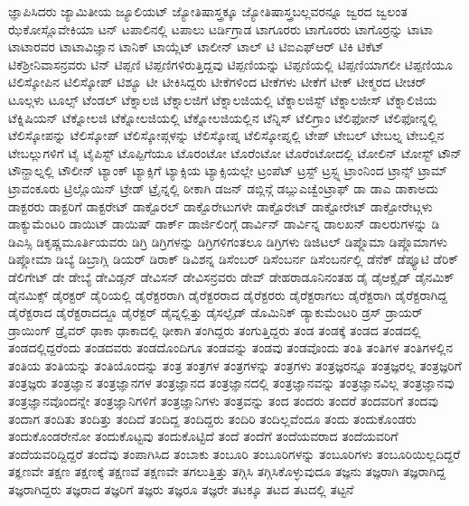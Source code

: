 {ಜ್ಞಾಪಿಸಿದರು
ಜ್ಯಾಮಿತೀಯ
ಜ್ಯೂಲಿಯಟ್
ಜ್ಯೋತಿಷಾಸ್ತ್ರಕ್ಕೂ
ಜ್ಯೋತಿಷಾಸ್ತ್ರಬಲ್ಲವರನ್ನೂ
ಜ್ವರದ
ಜ್ವಲಂತ
ಝೆಕೋಸ್ಲೊವೇಕಿಯಾ
ಟನ್
ಟಪಾಲಿನಲ್ಲಿ
ಟಪಾಲು
ಟರ್ಡಿಗ್ರಾಡ
ಟಾಗೂರರು
ಟಾಗೊರರು
ಟಾಗೊರ್ರನ್ನು
ಟಾಟಾ
ಟಾಟಾರವರ
ಟಾಟಾವಿಜ್ಞಾನ
ಟಾನಿಕ್
ಟಾಯ್ಲೆಟ್
ಟಾಲೀನ್
ಟಾಲ್
ಟಿ
ಟಿಐಎಫ್ಆರ್
ಟಿಕಿ
ಟಿಕೆಟ್
ಟಿಕೆಶ್ರೀನಿವಾಸನ್ರವರು
ಟಿನ್
ಟಿಪ್ಪಣಿ
ಟಿಪ್ಪಣಿಗಳಿರುತ್ತಿದ್ದವು
ಟಿಪ್ಪಣಿಯನ್ನು
ಟಿಪ್ಪಣಿಯಲ್ಲಿ
ಟಿಪ್ಪಣಿಯಾಗಲೀ
ಟಿಪ್ಪಣಿಯೂ
ಟಿಲಿಸ್ಕೋಪಿನ
ಟಿಲಿಸ್ಕೋಪ್
ಟಿಶ್ಯೂ
ಟೀ
ಟೀಕಿಸಿದ್ದರು
ಟೀಕೆಗಳಿಂದ
ಟೀಕೆಗಳು
ಟೀಕೆಗೆ
ಟೀಕ್
ಟೀಕ್ಮರದ
ಟೀಚರ್
ಟೂಲ್ಗಳು
ಟೂಲ್ಸ್
ಟೆಂಡಲ್
ಟೆಕ್ನಾಲಜಿ
ಟೆಕ್ನಾಲಜಿಗೆ
ಟೆಕ್ನಾಲಜಿಯಲ್ಲಿ
ಟೆಕ್ನಾಲಜಿಸ್ಟ್
ಟೆಕ್ನಾಲಜೀಸ್
ಟೆಕ್ನಾಲಿಜಿಯ
ಟೆಕ್ನಿಷಿಯನ್
ಟೆಕ್ನೋಲಜಿ
ಟೆಕ್ನೋಲಜಿಯಲ್ಲಿ
ಟೆಕ್ನೋಲಜಿಯಲ್ಲಿನ
ಟೆನ್ನಿಸ್
ಟೆಲಿಗ್ರಾಂ
ಟೆಲಿಫೋನ್
ಟೆಲಿಫೋನ್ನಲ್ಲಿ
ಟೆಲಿಸ್ಕೋಪನ್ನು
ಟೆಲಿಸ್ಕೋಪ್
ಟೆಲಿಸ್ಕೋಪ್ಗಳನ್ನು
ಟೆಲಿಸ್ಕೋಪ್ನ
ಟೆಲಿಸ್ಕೋಪ್ನಲ್ಲಿ
ಟೇಪ್
ಟೇಬಲ್
ಟೇಬಲ್ನ
ಟೇಬಲ್ಲಿನ
ಟೇಬಲ್ಲುಗಳಿಗೆ
ಟೈ
ಟೈಪಿಸ್ಟ್
ಟೊಪ್ಪಿಗೆಯೂ
ಟೊರಂಟೋ
ಟೊರೆಂಟೋ
ಟೊರೆಂಟೋದಲ್ಲಿ
ಟೋಲಿನ್
ಟೋಸ್ಟ್
ಟೌನ್
ಟೌನ್ಹಾಲ್ನಲ್ಲಿ
ಟೌಲೀನ್
ಟ್ಯಾಂಕ್
ಟ್ಯಾಕ್ಸಿಗೆ
ಟ್ಯಾಕ್ಸಿಯ
ಟ್ಯಾಕ್ಸಿಯಲ್ಲೇ
ಟ್ರಂಪೆಟ್
ಟ್ರಸ್ಟ್
ಟ್ರಸ್ಟ್ನ
ಟ್ರಾಂನಿಂದ
ಟ್ರಾನ್ಸ್
ಟ್ರಾಮ್
ಟ್ರಾವಂಕೂರು
ಟ್ರಿಲ್ಲೊಯಿನ್
ಟ್ರೇಡ್
ಟ್ರೈನ್ನಲ್ಲಿ
ಠೀಕಾಗಿ
ಡಜನ್
ಡಬ್ಲಿನ್ಗೆ
ಡಬ್ಲುಎಚ್ವೆಂಟ್ರಾಫ್
ಡಾ
ಡಾಎ
ಡಾಕಾಅದು
ಡಾಕ್ಟರರು
ಡಾಕ್ಟರಿಗೆ
ಡಾಕ್ಟರೇಟ್
ಡಾಕ್ಟೊರಲ್
ಡಾಕ್ಟೊರೇಟುಗಳೇ
ಡಾಕ್ಟೊರೇಟ್
ಡಾಕ್ಟೋರೇಟ್
ಡಾಕ್ಟೋರೇಟ್ಗಳು
ಡಾಕ್ಯುಮೆಂಟರಿ
ಡಾಯಿಟ್
ಡಾಯಿಷ್
ಡಾರ್ಕ್
ಡಾರ್ಜಿಲಿಂಗ್ಗೆ
ಡಾರ್ವಿನ್
ಡಾರ್ವಿನ್ನ
ಡಾಲಖನ್
ಡಾಲರುಗಳನ್ನು
ಡಿ
ಡಿಎಸ್ಸಿ
ಡಿಕೃಷ್ಣಮೂರ್ತಿಯವರು
ಡಿಗ್ರಿ
ಡಿಗ್ರಿಗಳನ್ನು
ಡಿಗ್ರಿಗಳಿಗಂತಲೂ
ಡಿಗ್ರಿಗಳು
ಡಿಜಿಟಲ್
ಡಿಪ್ಲೊಮಾ
ಡಿಪ್ಲೊಮಾಗಳು
ಡಿಪ್ಲೋಮಾ
ಡಿಬ್ಯೆ
ಡಿಬ್ರಾಗ್ಲಿ
ಡಿಯರ್
ಡಿರಾಕ್
ಡಿವಿಶನ್ನ
ಡಿಸೆಂಬರ್
ಡಿಸೆಂಬರ್ನ
ಡಿಸೆಂಬರ್ನಲ್ಲಿ
ಡೆನೆಕ್
ಡೆಪ್ಯೂಟಿ
ಡೆರಿಕ್
ಡೆಲಿಗೇಟ್
ಡೇ
ಡೇಬ್ಯೆ
ಡೇವಿಡ್ಸನ್
ಡೇವಿಸನ್
ಡೇವಿಸನ್ರವರು
ಡೇವ್
ಡೇಹರಾಡೂನಿನಂತಹ
ಡೈ
ಡೈಆಕ್ಸೈಡ್
ಡೈನಮಿಕ್
ಡೈನಮಿಕ್ಸ್
ಡೈರಕ್ಟರ್
ಡೈರಿಯಲ್ಲಿ
ಡೈರೆಕ್ಟರರಾಗಿ
ಡೈರೆಕ್ಟರರಾದ
ಡೈರೆಕ್ಟರರು
ಡೈರೆಕ್ಟರಾಗಲು
ಡೈರೆಕ್ಟರಾಗಿ
ಡೈರೆಕ್ಟರಾಗಿದ್ದ
ಡೈರೆಕ್ಟರಾದ
ಡೈರೆಕ್ಟರಾದದ್ದೂ
ಡೈರೆಕ್ಟರ್
ಡೈವ್ನಲ್ಲಿತ್ತು
ಡೈಸಲ್ಫೈಡ್
ಡೊಮಿನಿಕ್
ಡ್ಯಾಕುಮೆಂಟರಿ
ಡ್ರಸ್
ಡ್ರಾಯರ್
ಡ್ರಾಯಿಂಗ್
ಡ್ರೈವರ್
ಢಾಕಾ
ಢಾಕಾದಲ್ಲಿ
ಢೀಕಾಗಿ
ತಂಗಿದ್ದರು
ತಂಗುತ್ತಿದ್ದರು
ತಂಡ
ತಂಡಕ್ಕೆ
ತಂಡದ
ತಂಡದಲ್ಲಿ
ತಂಡದಲ್ಲಿದ್ದರೆಂದು
ತಂಡದವರು
ತಂಡದೊಂದಿಗೂ
ತಂಡವನ್ನು
ತಂಡವು
ತಂಡವೊಂದು
ತಂತಿ
ತಂತಿಗಳ
ತಂತಿಗಳಲ್ಲಿನ
ತಂತಿಯ
ತಂತಿಯನ್ನು
ತಂತಿಯೊಂದನ್ನು
ತಂತ್ರ
ತಂತ್ರಗಳ
ತಂತ್ರಗಳನ್ನು
ತಂತ್ರಗಳು
ತಂತ್ರಜ್ಞರನ್ನೂ
ತಂತ್ರಜ್ಞರಲ್ಲ
ತಂತ್ರಜ್ಞರಿಗೆ
ತಂತ್ರಜ್ಞರು
ತಂತ್ರಜ್ಞಾನ
ತಂತ್ರಜ್ಞಾನಗಳ
ತಂತ್ರಜ್ಞಾನದ
ತಂತ್ರಜ್ಞಾನದಲ್ಲಿ
ತಂತ್ರಜ್ಞಾನವನ್ನು
ತಂತ್ರಜ್ಞಾನವಿಲ್ಲ
ತಂತ್ರಜ್ಞಾನವು
ತಂತ್ರಜ್ಞಾನವೊಂದನ್ನೇ
ತಂತ್ರಜ್ಞಾನಿಗಳಿಗೆ
ತಂತ್ರಜ್ಞಾನಿಗಳು
ತಂತ್ರವನ್ನು
ತಂದ
ತಂದರು
ತಂದರೆ
ತಂದವರಿಗೆ
ತಂದವು
ತಂದಾಗ
ತಂದಿತು
ತಂದಿತ್ತು
ತಂದಿದೆ
ತಂದಿದ್ದ
ತಂದಿದ್ದರು
ತಂದಿರಿ
ತಂದಿಲ್ಲವೆಂದೂ
ತಂದು
ತಂದುಕೊಂಡರು
ತಂದುಕೊಂಡರೇನೋ
ತಂದುಕೊಟ್ಟವು
ತಂದುಕೊಟ್ಟಿದೆ
ತಂದೆ
ತಂದೆಗೆ
ತಂದೆಯವರಾದ
ತಂದೆಯವರಿಗೆ
ತಂದೆಯವರಿದ್ದಿದ್ದರೆ
ತಂದೆವು
ತಂಪಾಗಿಸಿದ
ತಂಬಾಕು
ತಂಬೂರಿ
ತಂಬೂರಿಗಳನ್ನು
ತಂಬೂರಿಗಳು
ತಂಬೂರಿಯಿಲ್ಲದಿದ್ದರೆ
ತಕ್ಞಣವೇ
ತಕ್ಷಣ
ತಕ್ಷಣಕ್ಕೆ
ತಕ್ಷಣವೆ
ತಕ್ಷಣವೇ
ತಗಲುತ್ತಿತ್ತು
ತಗ್ಗಿಸಿ
ತಗ್ಗಿಸಿಕೊಳ್ಳುವುದೂ
ತಜ್ಞನು
ತಜ್ಞರಾಗಿ
ತಜ್ಞರಾಗಿದ್ದ
ತಜ್ಞರಾಗಿದ್ದರು
ತಜ್ಞರಾದ
ತಜ್ಞರಿಗೆ
ತಜ್ಞರು
ತಜ್ಞರೂ
ತಜ್ಞರೇ
ತಟಕ್ಕೂ
ತಟದ
ತಟದಲ್ಲಿ
ತಟ್ಟನೆ
}
